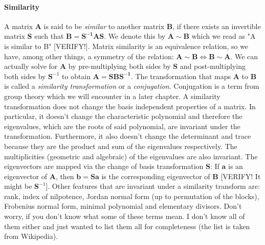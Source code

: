 \paragraph{Similarity}
A matrix $\mathbf{A}$ is said to be \emph{similar} to another matrix $\mathbf{B}$, if there exists an invertible matrix $\mathbf{S}$ such that $\mathbf{B} = \mathbf{S^{-1} A S}$. We denote this by $\mathbf{A} \sim \mathbf{B}$ which we read as "A is similar to B" [VERIFY!]. Matrix similarity is an equivalence relation, so we have, among other things, a symmetry of the relation: $\mathbf{A} \sim \mathbf{B} \Leftrightarrow \mathbf{B} \sim \mathbf{A}$. We can actually solve for $\mathbf{A}$ by pre-multiplying both sides by $\mathbf{S}$ and post-multiplying both sides by $\mathbf{S}^{-1}$ to obtain $\mathbf{A} = \mathbf{S B S^{-1}}$. The transformation that maps $\mathbf{A}$ to $\mathbf{B}$ is called a \emph{similarity transformation} or a \emph{conjugation}. Conjugation is a term from group theory which we will encounter in a later chapter. A similarity transformation does not change the basis independent properties of a matrix. In particular, it doesn't change the characteristic polynomial and therefore the eigenvalues, which are the  roots of said polynomial, are invariant under the transformation. Furthermore, it also doesn't change the determinant and trace because they are the product and sum of the eigenvalues respectively. The multiplicities (geometric and algebraic) of the eigenvalues are also invariant. The eigenvectors are mapped via the change of basis transformation $\mathbf{S}$: If $\mathbf{a}$ is an eigenvector of  $\mathbf{A}$, then $\mathbf{b} = \mathbf{S a}$ is the corresponding eigenvector of $\mathbf{B}$ [VERIFY! It might be $\mathbf{S}^{-1}$]. Other features that are invariant under a similarity transform are: rank, index of nilpotence, Jordan normal form (up to permutation of the blocks), Frobenius normal form, minimal polynomial and elementary divisors. Don't worry, if you don't know what some of these terms mean. I don't know all of them either and just wanted to list them all for completeness (the list is taken from Wikipedia).




